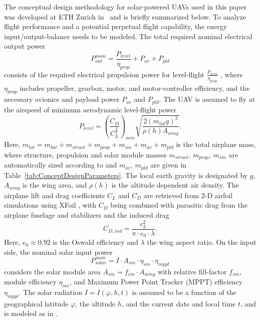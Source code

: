 The conceptual design methodology for solar-powered UAVs used in this paper was developed at ETH Zurich in~\cite{Noth_PhD,Leutenegger_JIRS} and is briefly summarized below. To analyze flight performance and a potential perpetual flight capability, the energy input/output-balance needs to be modeled. The total required nominal electrical output power
\begin{equation} \label{eqn:P_out}
P_{out}^{\,nom}=\frac{P_{level}}{\eta_{prop}}+P_{av}+P_{pld}
\end{equation}
consists of the required electrical propulsion power for level-flight $\frac{P_{level}}{\eta_{prop}}$ , where $\eta_{prop}$ includes propeller, gearbox, motor, and motor-controller efficiency, and the necessary avionics and payload power $P_{av}$ and $P_{pld}$. The UAV is assumed to fly at the airspeed of minimum aerodynamic level-flight power
\begin{equation} \label{eqn:P_level}
P_{level}=\left(\frac{C_D}{C_L^\frac{3}{2}}\right)_{min}\sqrt{\frac{2(m_{tot}g)^3}{\rho(h)A_{wing}}} .
\end{equation}
Here, $m_{tot}=m_{bat}+m_{struct}+m_{prop}+m_{sm}+m_{av}+m_{pld}$ is the total airplane mass, where structure, propulsion and solar module masses $m_{struct}$, $m_{prop}$, $m_{sm}$ are automatically sized according to \cite{Noth_PhD,Leutenegger_JIRS} and $m_{av}$, $m_{pld}$ are given in Table~\ref{tab:ConceptDesignParameters}. The local earth gravity is designated by $g$, $A_{wing}$ is the wing area, and $\rho(h)$ is the altitude dependent air density. The airplane lift and drag coefficients $C_L$ and $C_D$ are retrieved from 2-D airfoil simulations using XFoil \cite{Drela_XFoil}, with $C_D$ being combined with parasitic drag from the airplane fuselage and stabilizers and the induced drag  
\begin{equation} \label{eqn:C_D}
C_{D,ind}=\frac{c_L^2}{\pi\cdot e_0\cdot\lambda} .
\end{equation}
Here, $e_0\approx0.92$ is the Oswald efficiency and $\lambda$ the wing aspect ratio. On the input side, the nominal solar input power
\begin{equation} \label{eqn:P_solar}
P_{solar}^{\,nom}=I\cdot A_{sm}\cdot\eta_{sm}\cdot\eta_{mppt}
\end{equation}
considers the solar module area $A_{sm}=f_{sm}\cdot A_{wing}$ with relative fill-factor $f_{sm}$, module efficiency $\eta_{sm}$, and Maximum Power Point Tracker (MPPT) efficiency $\eta_{mppt}$. The solar radiation $I=I(\varphi,h,t)$ is assumed to be a function of the geographical latitude $\varphi$, the altitude $h$, and the current date and local time $t$, and is modeled as in \cite{Duffie_SolarEngineering}.
